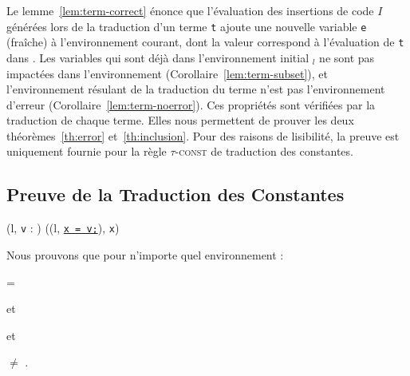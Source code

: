 Le lemme~\ref{lem:term-correct} énonce que l'évaluation des insertions de code
$I$ générées lors de la traduction d'un terme \lstinline't' ajoute une nouvelle
variable \lstinline'e' (fraîche) à l'environnement courant, dont la valeur
correspond à l'évaluation de \lstinline't' dans \env.
Les variables qui sont déjà dans l'environnement initial \env$_l$ ne sont pas
impactées dans l'environnement \env{} (Corollaire~\ref{lem:term-subset}), et
l'environnement résulant de la traduction du terme n'est pas l'environnement
d'erreur \errorenv (Corollaire~\ref{lem:term-noerror}).
Ces propriétés sont vérifiées par la traduction de chaque terme.
Elles nous permettent de prouver les deux théorèmes~\ref{th:error}
et~\ref{th:inclusion}.
Pour des raisons de lisibilité, la preuve est uniquement fournie pour la règle
\textsc{$\tau$-const} de traduction des constantes.




\subsection{Preuve de la Traduction des Constantes}

{
  { (l, \mbox{\lstinline'v'} : ) 
    ((l, \Zinit\underline{\mbox{\lstinline'x = v;'}}), \mbox{\lstinline'x'}) }
}

Nous prouvons que pour n'importe quel environnement \env  :

= 

et

\env \subenv {}

et

 $\neq$ \errorenv.

